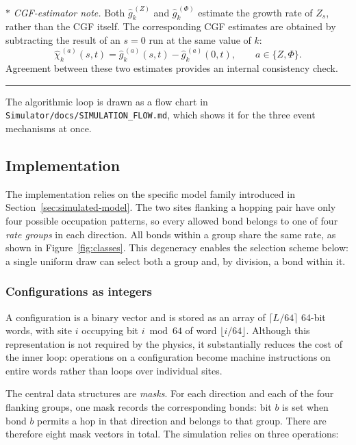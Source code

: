\documentclass[11pt]{article}
\begin{document}
\medskip
\noindent$\boldsymbol{*}$\textit{ CGF-estimator note.}
Both $\widehat{g}^{\,(Z)}_k$ and $\widehat{g}^{\,(\Phi)}_k$ estimate the growth rate of $Z_s$, rather than the CGF itself. The corresponding CGF estimates are obtained by subtracting the result of an $s=0$ run at the same value of $k$:
\[
    \widehat{\chi}^{\,(a)}_k(s,t)
    =\widehat{g}^{\,(a)}_k(s,t)
    -\widehat{g}^{\,(a)}_k(0,t),
    \qquad a\in\{Z,\Phi\}.
\]
Agreement between these two estimates provides an internal consistency check.

\smallskip
\noindent\rule{\linewidth}{0.6pt}
\medskip

The algorithmic loop is drawn as a flow chart in \texttt{Simulator/docs/SIMULATION\_FLOW.md}, which shows it for the three event mechanisms at once.

\subsection{Implementation}
\label{sec:implementation}

The implementation relies on the specific model family introduced in Section~\ref{sec:simulated-model}. The two sites flanking a hopping pair have only four possible occupation patterns, so every allowed bond belongs to one of four \emph{rate groups} in each direction. All bonds within a group share the same rate, as shown in Figure~\ref{fig:classes}. This degeneracy enables the selection scheme below: a single uniform draw can select both a group and, by division, a bond within it.


\subsubsection{Configurations as integers}
\label{sec:implementation-1}
A configuration is a binary vector and is stored as an array of $\lceil L/64 \rceil$ 64-bit words, with site $i$ occupying bit $i \bmod 64$ of word $\lfloor i/64 \rfloor$. Although this representation is not required by the physics, it substantially reduces the cost of the inner loop: operations on a configuration become machine instructions on entire words rather than loops over individual sites.

The central data structures are \emph{masks}. For each direction and each of the four flanking groups, one mask records the corresponding bonds: bit $b$ is set when bond $b$ permits a hop in that direction and belongs to that group. There are therefore eight mask vectors in total. The simulation relies on three operations:
\end{document}
